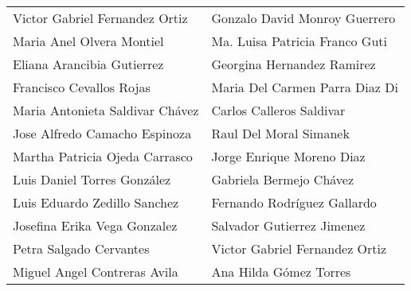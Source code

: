 \begin{tabular}{ m{} m{}  }
Victor Gabriel Fernandez Ortiz &Gonzalo David Monroy Guerrero  \\
Maria Anel Olvera Montiel &Ma. Luisa Patricia Franco Guti \\
Eliana Arancibia Gutierrez &Georgina Hernandez Ramirez \\
Francisco Cevallos Rojas&Maria Del Carmen Parra Diaz Di \\
Maria Antonieta Saldivar Chávez&Carlos Calleros Saldivar \\
Jose Alfredo Camacho Espinoza &Raul Del Moral Simanek \\
Martha Patricia Ojeda Carrasco &Jorge Enrique Moreno Diaz \\
Luis Daniel Torres González &Gabriela Bermejo Chávez\\
Luis Eduardo Zedillo Sanchez &Fernando Rodríguez Gallardo \\
Josefina Erika Vega Gonzalez&Salvador Gutierrez Jimenez \\
Petra Salgado Cervantes &Victor Gabriel Fernandez Ortiz \\
Miguel Angel Contreras Avila&Ana Hilda Gómez Torres \\
\end{tabular}

